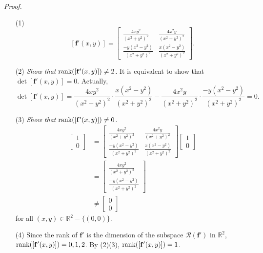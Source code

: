 \documentclass{article}
\begin{document}
\emph{Proof.}
\begin{enumerate}
\item[(1)]
  \[
    [\mathbf{f}'(x,y)]
    =
    \begin{bmatrix}
      \frac{4xy^2}{(x^2+y^2)^2} & \frac{4x^2y}{(x^2+y^2)^2} \\
      \frac{-y(x^2-y^2)}{(x^2+y^2)^2} & \frac{x(x^2-y^2)}{(x^2+y^2)^2}
    \end{bmatrix}.
  \]

\item[(2)]
  \emph{Show that $\rank([\mathbf{f}'(x,y)]) \neq 2$.}
  It is equivalent to show that $\det[\mathbf{f}'(x,y)] = 0$.
  Actually,
  \[
    \det[\mathbf{f}'(x,y)]
    = \frac{4xy^2}{(x^2+y^2)^2} \cdot \frac{x(x^2-y^2)}{(x^2+y^2)^2}
      - \frac{4x^2y}{(x^2+y^2)^2} \cdot \frac{-y(x^2-y^2)}{(x^2+y^2)^2}
    = 0.
  \]

\item[(3)]
  \emph{Show that $\rank([\mathbf{f}'(x,y)]) \neq 0$.}
  \begin{align*}
    [\mathbf{f}'(x,y)]
    \begin{bmatrix}
      1 \\
      0
    \end{bmatrix}
    &=
    \begin{bmatrix}
      \frac{4xy^2}{(x^2+y^2)^2} & \frac{4x^2y}{(x^2+y^2)^2} \\
      \frac{-y(x^2-y^2)}{(x^2+y^2)^2} & \frac{x(x^2-y^2)}{(x^2+y^2)^2}
    \end{bmatrix}
    \begin{bmatrix}
      1 \\
      0
    \end{bmatrix} \\
    &=
    \begin{bmatrix}
      \frac{4xy^2}{(x^2+y^2)^2} \\
      \frac{-y(x^2-y^2)}{(x^2+y^2)^2}
    \end{bmatrix} \\
    &\neq
    \begin{bmatrix}
      0 \\
      0
    \end{bmatrix}
  \end{align*}
  for all $(x,y) \in \mathbb{R}^2 - \{(0,0)\}$.

\item[(4)]
  Since the rank of $\mathbf{f}'$ is the dimension of the subspace
  $\mathscr{R}(\mathbf{f}')$ in $\mathbb{R}^2$,
  $\rank([\mathbf{f}'(x,y)]) = 0, 1, 2$.
  By (2)(3), $\rank([\mathbf{f}'(x,y)]) = 1$.


\end{enumerate}
\end{document}
